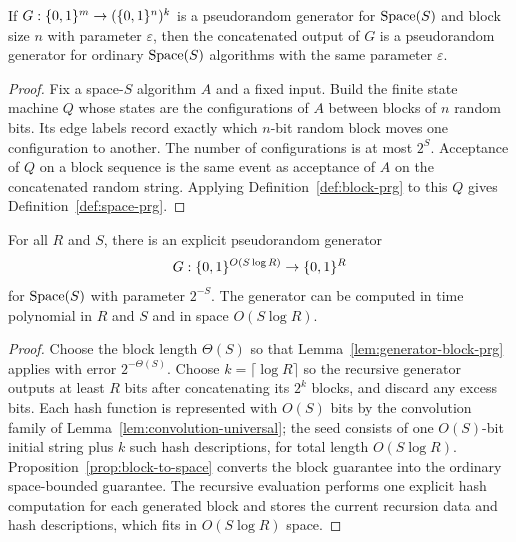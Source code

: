 \begin{proposition}
  \label{prop:block-to-space}
  If $G:\{0,1\}^m\to(\{0,1\}^n)^k$ is a pseudorandom generator for $\operatorname{Space}(S)$ and
  block size $n$ with parameter $\varepsilon$, then the concatenated output of
  $G$ is a pseudorandom generator for ordinary $\operatorname{Space}(S)$ algorithms with the
  same parameter $\varepsilon$.
\end{proposition}
\begin{proof}
  Fix a space-$S$ algorithm $A$ and a fixed input. Build the finite state
  machine $Q$ whose states are the configurations of $A$ between blocks of
  $n$ random bits. Its edge labels record exactly which $n$-bit random block
  moves one configuration to another. The number of configurations is at most
  $2^S$. Acceptance of $Q$ on a block sequence is the same event as acceptance
  of $A$ on the concatenated random string. Applying Definition~\ref{def:block-prg}
  to this $Q$ gives Definition~\ref{def:space-prg}.
\end{proof}

\begin{theorem}
  \label{thm:space-prg-main}
  For all $R$ and $S$, there is an explicit pseudorandom generator
  \[
    G:\{0,1\}^{O(S\log R)}\to\{0,1\}^R
  \]
  for $\operatorname{Space}(S)$ with parameter $2^{-S}$. The generator can be computed in
  time polynomial in $R$ and $S$ and in space $O(S\log R)$.
\end{theorem}
\begin{proof}
  Choose the block length $\Theta(S)$ so that Lemma~\ref{lem:generator-block-prg}
  applies with error $2^{-\Theta(S)}$. Choose $k=\lceil\log R\rceil$ so the
  recursive generator outputs at least $R$ bits after concatenating its
  $2^k$ blocks, and discard any excess bits. Each hash function is represented
  with $O(S)$ bits by the convolution family of
  Lemma~\ref{lem:convolution-universal}; the seed consists of one
  $O(S)$-bit initial string plus $k$ such hash descriptions, for total length
  $O(S\log R)$. Proposition~\ref{prop:block-to-space} converts the block
  guarantee into the ordinary space-bounded guarantee. The recursive evaluation
  performs one explicit hash computation for each generated block and stores
  the current recursion data and hash descriptions, which fits in
  $O(S\log R)$ space.
\end{proof}

